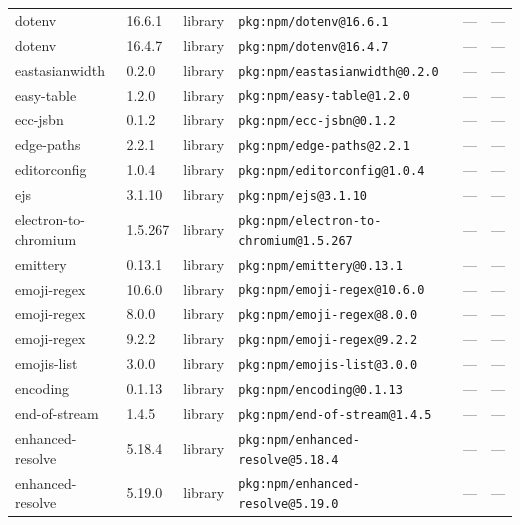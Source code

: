 \documentclass[11pt,a4paper]{article}
\begin{document}
\begin{longtable}{|p{4cm}|p{2cm}|p{1.6cm}|p{5cm}|p{1.5cm}|p{3.5cm}|}
\raggedright dotenv & 16.6.1 & library & \small\texttt{pkg:npm/dotenv@16.6.1} & — & \small — \\
\raggedright dotenv & 16.4.7 & library & \small\texttt{pkg:npm/dotenv@16.4.7} & — & \small — \\
\raggedright eastasianwidth & 0.2.0 & library & \small\texttt{pkg:npm/eastasianwidth@0.2.0} & — & \small — \\
\raggedright easy-table & 1.2.0 & library & \small\texttt{pkg:npm/easy-table@1.2.0} & — & \small — \\
\raggedright ecc-jsbn & 0.1.2 & library & \small\texttt{pkg:npm/ecc-jsbn@0.1.2} & — & \small — \\
\raggedright edge-paths & 2.2.1 & library & \small\texttt{pkg:npm/edge-paths@2.2.1} & — & \small — \\
\raggedright editorconfig & 1.0.4 & library & \small\texttt{pkg:npm/editorconfig@1.0.4} & — & \small — \\
\raggedright ejs & 3.1.10 & library & \small\texttt{pkg:npm/ejs@3.1.10} & — & \small — \\
\raggedright electron-to-chromium & 1.5.267 & library & \small\texttt{pkg:npm/electron-to-chromium@1.5.267} & — & \small — \\
\raggedright emittery & 0.13.1 & library & \small\texttt{pkg:npm/emittery@0.13.1} & — & \small — \\
\raggedright emoji-regex & 10.6.0 & library & \small\texttt{pkg:npm/emoji-regex@10.6.0} & — & \small — \\
\raggedright emoji-regex & 8.0.0 & library & \small\texttt{pkg:npm/emoji-regex@8.0.0} & — & \small — \\
\raggedright emoji-regex & 9.2.2 & library & \small\texttt{pkg:npm/emoji-regex@9.2.2} & — & \small — \\
\raggedright emojis-list & 3.0.0 & library & \small\texttt{pkg:npm/emojis-list@3.0.0} & — & \small — \\
\raggedright encoding & 0.1.13 & library & \small\texttt{pkg:npm/encoding@0.1.13} & — & \small — \\
\raggedright end-of-stream & 1.4.5 & library & \small\texttt{pkg:npm/end-of-stream@1.4.5} & — & \small — \\
\raggedright enhanced-resolve & 5.18.4 & library & \small\texttt{pkg:npm/enhanced-resolve@5.18.4} & — & \small — \\
\raggedright enhanced-resolve & 5.19.0 & library & \small\texttt{pkg:npm/enhanced-resolve@5.19.0} & — & \small — \\

\end{longtable}
\end{document}
